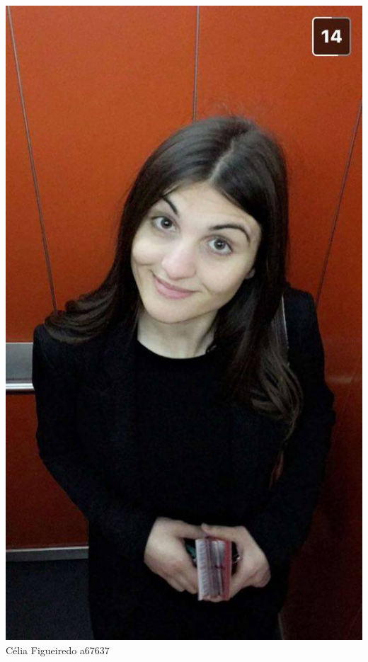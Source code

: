 \begin{titlepage}
\begin{center}
\noindent\begin{minipage}[b]{.1\textwidth}
	\includegraphics[scale=0.1]{celia}
	\tiny{Célia Figueiredo a67637}
\end{minipage} 
\hfill
\begin{minipage}[b]{.1\textwidth}

\end{minipage}
\end{center}
\end{titlepage}
